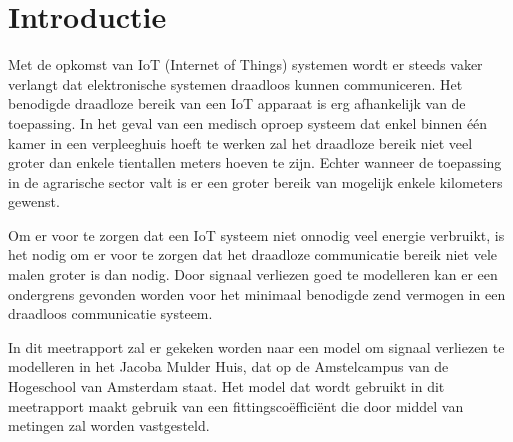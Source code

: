 \section{Introductie}

Met de opkomst van IoT (Internet of Things) systemen wordt er steeds vaker verlangt dat elektronische systemen draadloos kunnen communiceren. Het benodigde draadloze bereik van een IoT apparaat is erg afhankelijk van de toepassing. In het geval van een medisch oproep systeem dat enkel binnen één kamer in een verpleeghuis hoeft te werken zal het draadloze bereik niet veel groter dan enkele tientallen meters hoeven te zijn. Echter wanneer de toepassing in de agrarische sector valt is er een groter bereik van mogelijk enkele kilometers gewenst. 

Om er voor te zorgen dat een IoT systeem niet onnodig veel energie verbruikt, is het nodig om er voor te zorgen dat het draadloze communicatie bereik niet vele malen groter is dan nodig. Door signaal verliezen goed te modelleren kan er een ondergrens gevonden worden voor het minimaal benodigde zend vermogen in een draadloos communicatie systeem.

In dit meetrapport zal er gekeken worden naar een model om signaal verliezen te modelleren in het Jacoba Mulder Huis, dat op de 
Amstelcampus van de Hogeschool van Amsterdam staat. Het model dat wordt gebruikt in dit meetrapport maakt gebruik van een fittingscoëfficiënt die door middel van metingen zal worden vastgesteld.


